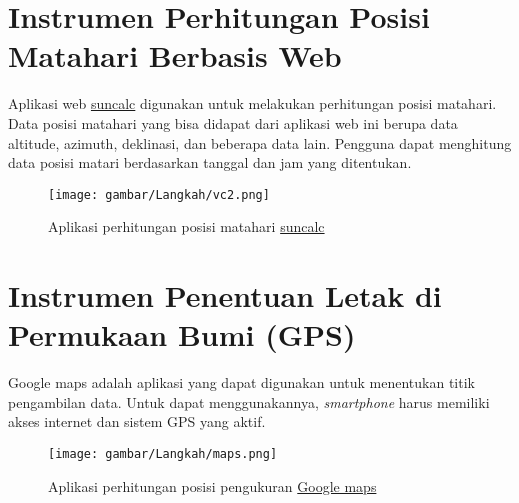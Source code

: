 \section{Instrumen Perhitungan Posisi Matahari Berbasis Web}
Aplikasi web \href{https://www.suncalc.org/#/-8.0905,112.6468,18/2023.11.10/18:00/1/3}{suncalc} digunakan untuk melakukan perhitungan posisi matahari. Data posisi matahari yang bisa didapat dari aplikasi web ini berupa data altitude, azimuth, deklinasi, dan beberapa data lain. Pengguna dapat menghitung data posisi matari berdasarkan tanggal dan jam yang ditentukan.
\begin{figure}[H]
    \centering
    \texttt{[image: gambar/Langkah/vc2.png]}
    \caption{Aplikasi perhitungan posisi matahari \href{https://www.suncalc.org}{suncalc}}
\end{figure}

\section{Instrumen Penentuan Letak di Permukaan Bumi (GPS)}
Google maps adalah aplikasi yang dapat digunakan untuk menentukan titik pengambilan data. Untuk dapat menggunakannya, \textit{smartphone} harus memiliki akses internet dan sistem GPS yang aktif.
\begin{figure}[H]
    \centering
    \texttt{[image: gambar/Langkah/maps.png]}
    \caption{Aplikasi perhitungan posisi pengukuran \href{https://www.google.com/maps}{Google maps}}
\end{figure}

